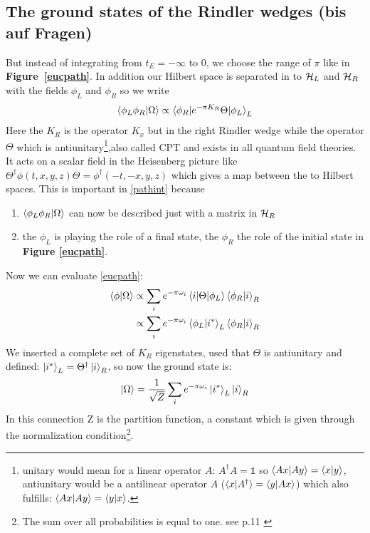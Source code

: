 \subsection{The ground states of the Rindler wedges \checkmark (bis auf Fragen)}
	But instead of integrating from $t_E= -\infty$ to 0, we choose the range of $\pi$ like in \textbf{Figure~\ref{eucpath}}. In addition our Hilbert space is separated in to $\mathcal{H}_L$ and $\mathcal{H}_R$ with the fields $\phi_L$ and $\phi_R$ so we write 
	\begin{align} \label{pathint}
		\braket{\phi_L \phi_R | \Omega} \propto \braket{\phi_R| e^{-\pi K_R} \Theta| \phi_L}_L
	\end{align}
	Here the $K_R$ is the operator $K_x$ but in the right Rindler wedge while the operator $\Theta$ which is antiunitary\footnote{unitary would mean for a linear operator $A$: $A^\dagger A = \mathds{1}$ so $\braket{Ax|Ay}=\braket{x|y}$, antiunitary would be a antilinear operator $A$ ($\braket{x|A^\dagger}=\braket{y|Ax}$) which also fulfills: $\braket{Ax|Ay}=\braket{y|x}$. },also called CPT and exists in all quantum field theories. It acts on a scalar field in the Heisenberg picture like $\Theta^\dagger \phi(t,x,y,z)\Theta = \phi^\dagger(-t,-x,y,z)$ which gives a map between the to Hilbert spaces. This is important in \eqref{pathint} because 
		\begin{enumerate}
			\item $\braket{\phi_L \phi_R| \Omega}$ can now be described just with a matrix in $\mathcal{H}_R$
			\item the $\phi_L$ is playing the role of a final state, the $\phi_R$ the role of the initial state in \textbf{Figure \ref{eucpath}}.
		\end{enumerate}
	Now we can evaluate \eqref{eucpath}:
	\begin{align}
		\braket{\phi|\Omega} &\propto \sum_i e^{-\pi \omega_i} \braket{i | \Theta | \phi_L} \braket{\phi_R|i}_R \nonumber\\
		&\propto \sum_i e^{-\pi \omega_i} \braket{\phi_L| i^*}_L\braket{\phi_R|i}_R
	\end{align} %
	We inserted a complete set of  $K_R$ eigenstates, used that $\Theta$ is antiunitary and defined: $\ket{i^*}_L = \Theta^\dagger \ket{i}_R$, so now the ground state is:
	\begin{align} \label{groundstate}
		\ket{\Omega} = \frac{1}{\sqrt{Z}} \sum_i  e^{-\pi \omega_i} \ket{i^*}_L \ket{i}_R 
	\end{align}
	In this connection Z is the partition function, a constant which is given through the normalization condition\footnote{The sum over all probabilities is equal to one. see p.11 \cite{Brenig}}. 
	
